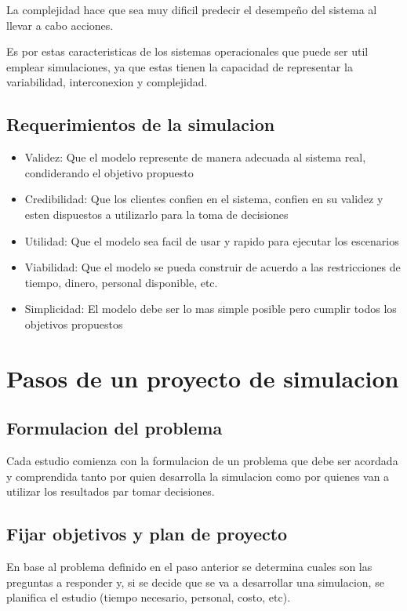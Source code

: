 \documentclass[a4paper]{article}
\begin{document}
La complejidad hace que sea muy dificil predecir el desempeño del sistema
al llevar a cabo acciones.

Es por estas caracteristicas de los sistemas operacionales que puede ser
util emplear simulaciones, ya que estas tienen la capacidad de representar
la variabilidad, interconexion y complejidad.

\subsection*{Requerimientos de la simulacion}
\begin{itemize}
    \item Validez: Que el modelo represente de manera adecuada al sistema real,
    condiderando el objetivo propuesto
    \item Credibilidad: Que los clientes confien en el sistema, confien en su 
    validez y esten dispuestos a utilizarlo para la toma de decisiones
    \item Utilidad: Que el modelo sea facil de usar y rapido para ejecutar los 
    escenarios
    \item Viabilidad: Que el modelo se pueda construir de acuerdo a las restricciones
    de tiempo, dinero, personal disponible, etc.
    \item Simplicidad: El modelo debe ser lo mas simple posible pero cumplir todos los 
    objetivos propuestos
\end{itemize}


\section*{Pasos de un proyecto de simulacion}

\subsection*{Formulacion del problema}
Cada estudio comienza con la formulacion de un problema que debe ser acordada
y comprendida tanto por quien desarrolla la simulacion como por quienes van 
a utilizar los resultados par tomar decisiones.

\subsection*{Fijar objetivos y plan de proyecto}
En base al problema definido en el paso anterior se determina cuales son las 
preguntas a responder y, si se decide que se va a desarrollar una simulacion,
se planifica el estudio (tiempo necesario, personal, costo, etc).
\end{document}
